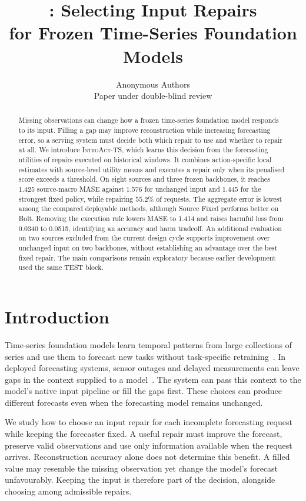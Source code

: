 \documentclass{article}
\title{\introact{}: Selecting Input Repairs \\
for Frozen Time-Series Foundation Models}
\author{Anonymous Authors\\Paper under double-blind review}
\newcommand{\introact}{\textsc{IntroAct-TS}}
\begin{document}
\maketitle

\begin{abstract}
Missing observations can change how a frozen time-series foundation model responds to its
input. Filling a gap may improve reconstruction while increasing forecasting error, so a
serving system must decide both which repair to use and whether to repair at all.
We introduce \introact{}, which learns this decision from the forecasting utilities of
repairs executed on historical windows. It combines action-specific local estimates with
source-level utility means and executes a repair only when its penalised score exceeds a
threshold. On eight sources and three frozen backbones, it reaches 1.425 source-macro MASE
against 1.576 for unchanged input and 1.445 for the strongest fixed policy, while repairing
$55.2\%$ of requests. The aggregate error is lowest among the compared deployable methods,
although Source Fixed performs better on Bolt. Removing the execution rule lowers MASE to
1.414 and raises harmful loss from 0.0340 to 0.0515, identifying an accuracy and harm tradeoff.
An additional evaluation on two sources excluded from the current design cycle supports
improvement over unchanged input on two backbones, without establishing an advantage over
the best fixed repair. The main comparisons remain exploratory because earlier development
used the same TEST block.
\end{abstract}

\section{Introduction}
\label{sec:intro}
Time-series foundation models learn temporal patterns from large collections of series and
use them to forecast new tasks without task-specific
retraining~\citep{ansari2024chronos,chronosbolt2025,das2024timesfm,woo2024moirai,chronos2_2025}.
In deployed forecasting systems, sensor outages and delayed measurements can leave gaps in
the context supplied to a model~\citep{chen2024bitgraph,peng2025s4m}. The system can pass
this context to the model's native input pipeline or fill the gaps first. These choices
can produce different forecasts even when the forecasting model remains unchanged.

We study how to choose an input repair for each incomplete forecasting request while keeping
the forecaster fixed. A useful repair must improve the forecast, preserve valid observations
and use only information available when the request arrives. Reconstruction accuracy alone
does not determine this benefit. A filled value may resemble the missing observation yet
change the model's forecast unfavourably. Keeping the input is therefore part of the decision,
alongside choosing among admissible repairs.
\end{document}
